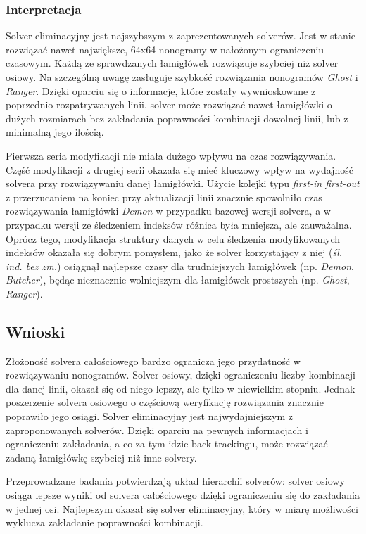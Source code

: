 \clearpage
\subsubsection{Interpretacja}
    Solver eliminacyjny jest najszybszym z zaprezentowanych solverów. Jest w stanie rozwiązać
nawet największe, 64x64 nonogramy w nałożonym ograniczeniu czasowym. Każdą ze sprawdzanych łamigłówek
rozwiązuje szybciej niż solver osiowy. Na szczególną uwagę zasługuje szybkość rozwiązania nonogramów
\textit{Ghost} i \textit{Ranger}. Dzięki oparciu się o informacje, które zostały wywnioskowane z poprzednio
rozpatrywanych linii, solver może rozwiązać nawet łamigłówki o dużych rozmiarach bez zakładania
poprawności kombinacji dowolnej linii, lub z minimalną jego ilością.

    Pierwsza seria modyfikacji nie miała dużego wpływu na czas rozwiązywania. Część modyfikacji z
drugiej serii okazała się mieć kluczowy wpływ na wydajność solvera przy rozwiązywaniu danej łamigłówki. Użycie kolejki
typu \textit{first-in first-out} z przerzucaniem na koniec przy aktualizacji linii znacznie spowolniło
czas rozwiązywania łamigłówki \textit{Demon} w przypadku bazowej wersji solvera,
a w przypadku wersji ze śledzeniem indeksów różnica była mniejsza, ale zauważalna.
Oprócz tego, modyfikacja struktury danych w celu śledzenia modyfikowanych indeksów
okazała się dobrym pomysłem, jako że solver korzystający z niej (\textit{śl. ind. bez zm.}) osiągnął
najlepsze czasy dla trudniejszych łamigłówek (np. \textit{Demon}, \textit{Butcher}), 
będąc nieznacznie wolniejszym dla łamigłówek prostszych (np. \textit{Ghost}, \textit{Ranger}).


\subsection{Wnioski}
    Złożoność solvera całościowego bardzo ogranicza jego przydatność w rozwiązywaniu nonogramów.
Solver osiowy, dzięki ograniczeniu liczby kombinacji dla danej linii, okazał się od niego lepszy,
ale tylko w niewielkim stopniu. Jednak poszerzenie solvera osiowego o częściową weryfikację rozwiązania
znacznie poprawiło jego osiągi. Solver eliminacyjny jest najwydajniejszym z zaproponowanych solverów. Dzięki oparciu na pewnych
informacjach i ograniczeniu zakładania, a co za tym idzie back-trackingu, może rozwiązać zadaną
łamigłówkę szybciej niż inne solvery.

    Przeprowadzane badania potwierdzają układ hierarchii solverów: solver osiowy osiąga lepsze wyniki
od solvera całościowego dzięki ograniczeniu się do zakładania w jednej osi. Najlepszym okazał
się solver eliminacyjny, który w miarę możliwości wyklucza zakładanie poprawności kombinacji.



